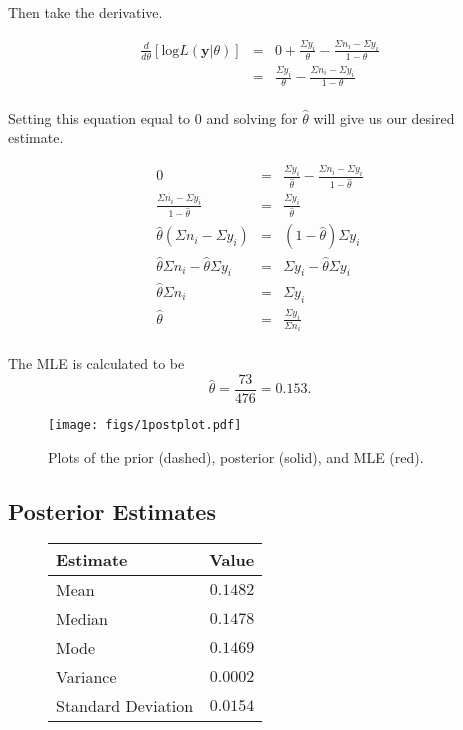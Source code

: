 \documentclass[12pt]{article}
\begin{document}
\noindent Then take the derivative.  

\begin{eqnarray*}
\frac{d}{d\theta}\left[\mathrm{log}L(\mathbf{y}|\theta)\right] &=& 0 + \frac{\Sigma y_i}{\theta} - \frac{\Sigma n_i-\Sigma y_i}{1-\theta} \\
&=& \frac{\Sigma y_i}{\theta} - \frac{\Sigma n_i-\Sigma y_i}{1-\theta} \\
\end{eqnarray*}

\noindent Setting this equation equal to 0 and solving for $\hat{\theta}$ will give us our desired estimate.

\begin{eqnarray*}
0 &=& \frac{\Sigma y_i}{\hat{\theta}} - \frac{\Sigma n_i-\Sigma y_i}{1-\hat{\theta}}\\
\frac{\Sigma n_i-\Sigma y_i}{1-\hat{\theta}} &=& \frac{\Sigma y_i}{\hat{\theta}} \\
\hat{\theta}(\Sigma n_i-\Sigma y_i) &=& (1-\hat{\theta})\Sigma y_i \\
\hat{\theta}\Sigma n_i - \hat{\theta}\Sigma y_i &=& \Sigma y_i -\hat{\theta}\Sigma y_i \\
\hat{\theta}\Sigma n_i &=& \Sigma y_i \\
\hat{\theta} &=& \frac{\Sigma y_i}{\Sigma n_i} \\
\end{eqnarray*}

\noindent The MLE is calculated to be
\[\hat{\theta}=\frac{73}{476}=0.153.\]

\begin{figure}[H]
\begin{center}
\texttt{[image: figs/1postplot.pdf]}
\caption{Plots of the prior (dashed), posterior (solid), and MLE (red).}
\end{center}
\end{figure}


\subsection{Posterior Estimates}

\begin{figure}[H]
\begin{center}
\begin{tabular}{l|r}
Estimate & \multicolumn{1}{l}{Value} \\ \hline \hline
Mean               & $0.1482$ \\
Median             & $0.1478$ \\
Mode               & $0.1469$ \\
Variance           & $0.0002$ \\
Standard Deviation & $0.0154$ \\
\end{tabular}
\end{center}
\end{figure}
\end{document}
